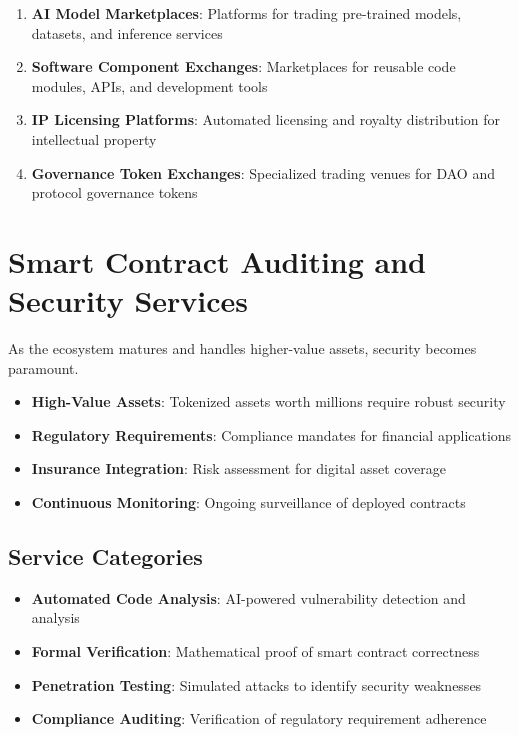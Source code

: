 \documentclass[11pt,a4paper]{report}
\begin{document}
\begin{enumerate}
    \item \textbf{AI Model Marketplaces}: Platforms for trading pre-trained models, datasets, and inference services
    \item \textbf{Software Component Exchanges}: Marketplaces for reusable code modules, APIs, and development tools
    \item \textbf{IP Licensing Platforms}: Automated licensing and royalty distribution for intellectual property
    \item \textbf{Governance Token Exchanges}: Specialized trading venues for DAO and protocol governance tokens
\end{enumerate}

\section{Smart Contract Auditing and Security Services}

As the ecosystem matures and handles higher-value assets, security becomes paramount.

\begin{keypoint}
\begin{itemize}
    \item \textbf{High-Value Assets}: Tokenized assets worth millions require robust security
    \item \textbf{Regulatory Requirements}: Compliance mandates for financial applications
    \item \textbf{Insurance Integration}: Risk assessment for digital asset coverage
    \item \textbf{Continuous Monitoring}: Ongoing surveillance of deployed contracts
\end{itemize}
\end{keypoint}

\subsection{Service Categories}

\begin{itemize}
    \item \textbf{Automated Code Analysis}: AI-powered vulnerability detection and analysis
    \item \textbf{Formal Verification}: Mathematical proof of smart contract correctness
    \item \textbf{Penetration Testing}: Simulated attacks to identify security weaknesses
    \item \textbf{Compliance Auditing}: Verification of regulatory requirement adherence
\end{itemize}
\end{document}
